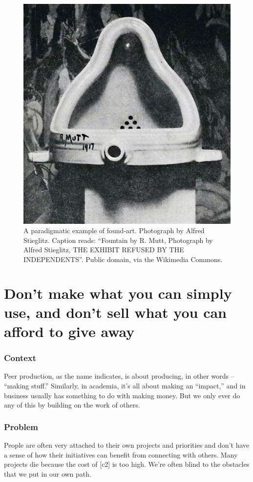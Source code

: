 \begingroup \color{OliveGreen}

\begin{figure}
\begin{center}
\includegraphics[width=.4\textwidth]{figures/Duchamp_Fountaine/Duchamp_Fountaine.jpg}
\end{center}
\caption{A paradigmatic example of found-art. Photograph by Alfred Stieglitz. Caption reads: ``Fountain by R. Mutt, Photograph by Alfred Stieglitz, THE EXHIBIT REFUSED BY THE INDEPENDENTS''. Public domain, via the Wikimedia Commons.}
\end{figure}

\section{Don't make what you can simply use, and don't sell what you can afford to give away} \label{sec:Use_or_make}

\subsubsection*{Context}
Peer production, as the name indicates, is about producing, in other words -- ``making stuff.''  Similarly, in academia, it's all about making an ``impact,'' and in business usually has something to do with making money.  But we only ever do any of this by building on the work of others.    

\subsubsection*{Problem}
People are often very attached to their own projects and priorities and don't have a sense of how their initiatives can benefit from connecting with others. Many projects die because the cost of  [c2] is too high.  We're often blind to the obstacles that we put in our own path.

